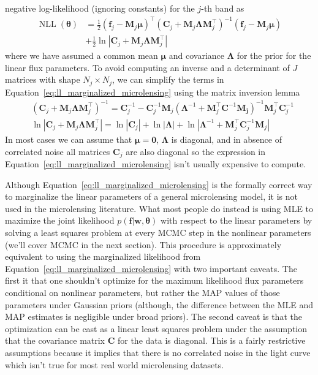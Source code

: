 \documentclass[12pt,dvipsnames]{report}
\renewcommand{\vec}[1]{\boldsymbol{\mathbf{#1}}}
\begin{document}
negative log-likelihood (ignoring constants) for the $j$-th band as
\begin{align}
    \operatorname{NLL}(\vec{\theta}) & =\frac{1}{2}\left( \vec{f}_j-\vec{M}_j\vec{\mu}\right)^\intercal\left(\vec{C}_j + \vec{M}_j\vec{\Lambda}\vec{M}_j^\intercal\right)^{-1}
    \left( \vec{f}_j-\vec{M}_j\vec{\mu}\right)                                                                                                                                 \\
                                     & + \frac{1}{2}\ln\left| \vec{C}_j + \vec{M}_j\vec{\Lambda}\vec{M}_j^\intercal\right|
    \label{eq:ll_marginalized_microlensing}
\end{align}
where we have assumed a common mean $\vec{\mu}$ and covariance $\vec{\Lambda}$ for the
prior for the linear flux parameters.
To avoid computing an inverse and a determinant of $J$ matrices with shape $N_j\times N_j$,
we can simplify the terms in Equation~\ref{eq:ll_marginalized_microlensing} using the
matrix inversion lemma \citep[see for example Appendix A3 in][]{rasmussen2006}
\begin{align}
     & \left(\mathbf{C}_j+\vec{M}_j \boldsymbol{\Lambda} \vec{M}_j^{\intercal}\right)^{-1}=\mathbf{C}_j^{-1}-\mathbf{C}_j^{-1} \vec{M}_j\left(\boldsymbol{\Lambda}^{-1}+\vec{M}_j^{\intercal} \mathbf{C}^{-1} \vec{M_j}\right)^{-1} \vec{M}_j^{\intercal} \mathbf{C}_j^{-1} \\
     & \ln\left|\mathbf{C}_j+\vec{M}_j \vec{\Lambda} \vec{M}_j^{\intercal}\right|=\ln|\mathbf{C}_j| +\ln|\vec{\Lambda}| + \ln\left|\boldsymbol{\Lambda}^{-1}+\vec{M}_j^{\intercal} \mathbf{C}_j^{-1} \vec{M}_j\right|
\end{align}
In most cases we can assume that $\vec{\mu}=\vec{0}$, $\vec{\Lambda}$ is diagonal, and
in absence of correlated noise all matrices $\vec{C}_j$ are also diagonal so the expression
in Equation~\ref{eq:ll_marginalized_microlensing} isn't usually expensive to compute.

Although Equation~\ref{eq:ll_marginalized_microlensing} is the formally correct
way to marginalize the linear parameters of a general microlensing model, it is
not used in the microlensing literature. What most people do instead is using
MLE to maximize the joint likelihood $p(\vec{f}\lvert\vec{w},\vec{\theta})$
with respect to the linear parameters by solving a least squares problem at
every MCMC step in the nonlinear parameters (we'll cover MCMC in the next
section). This procedure is approximately equivalent to using the marginalized
likelihood from Equation~\ref{eq:ll_marginalized_microlensing} with two
important caveats. The first it that one shouldn't optimize for the maximum
likelihood flux parameters conditional on nonlinear parameters, but rather the
MAP values of those parameters under Gaussian priors (although, the difference
between the MLE and MAP estimates is negligible under broad priors). The second
caveat is that the optimization can be cast as a linear least squares problem
under the assumption that the covariance matrix $\vec{C}$ for the data is
diagonal. This is a fairly restrictive assumptions because it implies that
there is no correlated noise in the light curve which isn't true for most real
world microlensing datasets.
\end{document}
